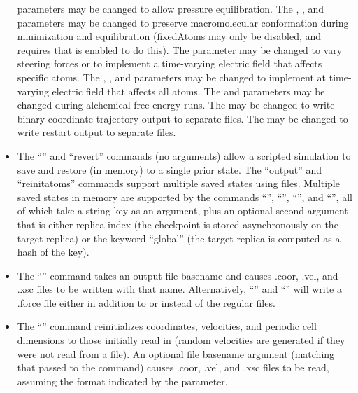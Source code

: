 \begin{itemize}
    parameters may be changed to allow pressure equilibration.
    The , , and
     parameters may be
    changed to preserve macromolecular conformation during minimization and
    equilibration (fixedAtoms may only be disabled, and requires that
     is enabled to do this).
    The  parameter may be changed to vary steering forces
    or to implement a time-varying electric field that affects specific atoms.
    The , , and
     parameters may be changed to implement
    at time-varying electric field that affects all atoms.
    The  and 
    parameters may be changed during alchemical free energy runs.
    The  may be changed to write binary coordinate trajectory
    output to separate files.
    The  may be changed to write restart output to separate files.
 \item The ``'' and ``revert'' commands (no arguments) allow
    a scripted simulation to save and restore (in memory) to a single prior state.
    The ``output'' and ``reinitatoms'' commands support multiple saved states using files.
    Multiple saved states in memory are supported by the commands
    ``'', ``'', ``'', and
    ``'', all of which take a string key as an argument,
    plus an optional second argument that is either
    replica index (the checkpoint is stored asynchronously on the target replica)
    or the keyword ``global'' (the target replica is computed as a hash of the key).
 \item The ``'' command takes an output file basename and causes
    .coor, .vel, and .xsc files to be written with that name.
    Alternatively, ``'' and
    ``'' will write a .force file
    either in addition to or instead of the regular files.
 \item The ``'' command reinitializes coordinates,
    velocities, and periodic cell dimensions to those initially read in
    (random velocities are generated if they were not read from a file).
    An optional file basename argument (matching that passed to the  command)
    causes .coor, .vel, and .xsc files to be read,
    assuming the format indicated by the  parameter.

\end{itemize}
